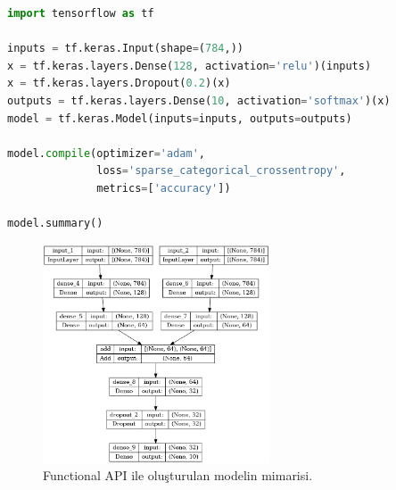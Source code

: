 \begin{lstlisting}[language=Python]
import tensorflow as tf

inputs = tf.keras.Input(shape=(784,))
x = tf.keras.layers.Dense(128, activation='relu')(inputs)
x = tf.keras.layers.Dropout(0.2)(x)
outputs = tf.keras.layers.Dense(10, activation='softmax')(x)
model = tf.keras.Model(inputs=inputs, outputs=outputs)

model.compile(optimizer='adam',
              loss='sparse_categorical_crossentropy',
              metrics=['accuracy'])

model.summary()
\end{lstlisting}

\begin{figure}[ht]
    \centering
    \includegraphics[width=0.6\textwidth]{images/functional_model.png}
    \caption{Functional API ile oluşturulan modelin mimarisi.}
    \label{fig:enter-label}
\end{figure}

\newpage